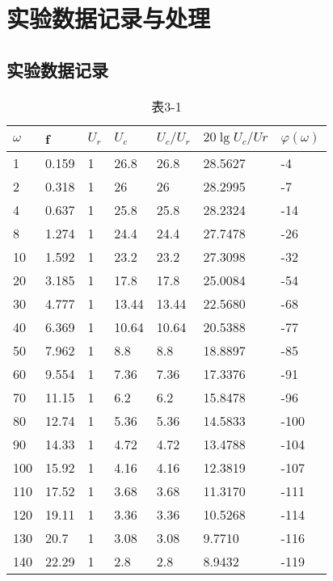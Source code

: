 \documentclass[UTF8,a4paper,10pt]{ctexart}
\begin{document}
\section{实验数据记录与处理}
\subsection{实验数据记录}
	\begin{table}[h]
		\caption{表3-1}
		\centering
		\begin{tabular}{|l|l|l|l|l|l|l|}
			\hline
			$\omega$  & f     & $U_{r}$ & $U_{c}$    & $U_{c}/U_{r}$ & $20\lg U_{c}/U{r}$    & $\varphi(\omega)$ \\ \hline
			1   & 0.159 & 1  & 26.8  & 26.8  & 28.5627   & -4     \\ \hline
			2   & 0.318 & 1  & 26    & 26    & 28.2995   & -7     \\ \hline
			4   & 0.637 & 1  & 25.8  & 25.8  & 28.2324   & -14    \\ \hline
			8   & 1.274 & 1  & 24.4  & 24.4  & 27.7478   & -26    \\ \hline
			10  & 1.592 & 1  & 23.2  & 23.2  & 27.3098   & -32    \\ \hline
			20  & 3.185 & 1  & 17.8  & 17.8  & 25.0084   & -54    \\ \hline
			30  & 4.777 & 1  & 13.44 & 13.44 & 22.5680   & -68    \\ \hline
			40  & 6.369 & 1  & 10.64 & 10.64 & 20.5388   & -77    \\ \hline
			50  & 7.962 & 1  & 8.8   & 8.8   & 18.8897   & -85    \\ \hline
			60  & 9.554 & 1  & 7.36  & 7.36  & 17.3376   & -91    \\ \hline
			70  & 11.15 & 1  & 6.2   & 6.2   & 15.8478   & -96    \\ \hline
			80  & 12.74 & 1  & 5.36  & 5.36  & 14.5833   & -100   \\ \hline
			90  & 14.33 & 1  & 4.72  & 4.72  & 13.4788   & -104   \\ \hline
			100 & 15.92 & 1  & 4.16  & 4.16  & 12.3819   & -107   \\ \hline
			110 & 17.52 & 1  & 3.68  & 3.68  & 11.3170   & -111   \\ \hline
			120 & 19.11 & 1  & 3.36  & 3.36  & 10.5268   & -114   \\ \hline
			130 & 20.7  & 1  & 3.08  & 3.08  & 9.7710    & -116   \\ \hline
			140 & 22.29 & 1  & 2.8   & 2.8   & 8.9432    & -119   \\ \hline

\end{tabular}
\end{table}
\end{document}
